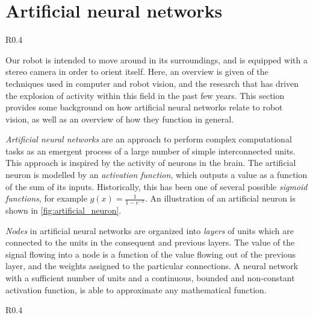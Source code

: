 \documentclass[\rootfolder/main.tex]{subfiles}
\begin{document}

\section{Artificial neural networks}

\begin{wrapfigure}{R}{0.4\columnwidth}
    \caption{Model of an artificial neuron.\label{fig:artificial_neuron}}
\end{wrapfigure}

Our robot is intended to move around in its surroundings, and is equipped with a stereo camera in order to orient itself.
Here, an overview is given of the techniques used in computer and robot vision, and the research that has driven the explosion of activity within this field in the past few years.
This section provides some background on how artificial neural networks relate to robot vision, as well as an overview of how they function in general.

\emph{Artificial neural networks} are an approach to perform complex computational tasks as an emergent process of a large number of simple interconnected units.
This approach is inspired by the activity of neurons in the brain.
The artificial neuron is modelled by an \emph{activation function}, which outputs a value as a function of the sum of its inputs.
Historically, this has been one of several possible \emph{sigmoid functions}, for example $g\left(x\right) = \frac{1}{1 - e^{-x}}$.
An illustration of an artificial neuron is shown in \cref{fig:artificial_neuron}.

\emph{Nodes} in artificial neural networks are organized into \emph{layers} of units which are connected to the units in the consequent and previous layers.
The value of the signal flowing into a node is a function of the value flowing out of the previous layer, and the weights assigned to the particular connections.
A neural network with a sufficient number of units and a continuous, bounded and non-constant activation function, is able to approximate any mathematical function\cite{Cybenko1989}\cite{Hornik1991}.

\begin{wrapfigure}{R}{0.4\columnwidth}
    \caption{\acrshort{xor} network, illustrating how neurons can implement basic logic functions.\label{fig:xor_net}}
\end{wrapfigure}
\end{document}
